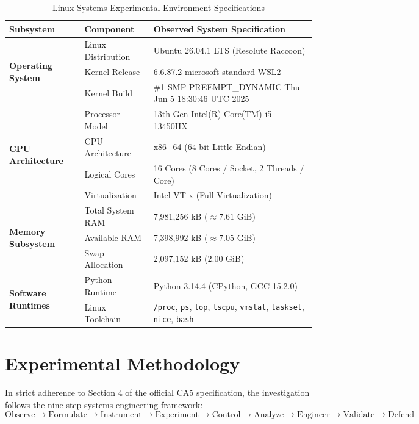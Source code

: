 \documentclass[11pt,a4paper]{article}
\begin{document}
\begin{table}[H]
\centering
\caption{Linux Systems Experimental Environment Specifications}
\label{tab:environment}
\begin{tabularx}{\textwidth}{llX}
\toprule
\textbf{Subsystem} & \textbf{Component} & \textbf{Observed System Specification} \\
\midrule
\multirow{3}{*}{\textbf{Operating System}} & Linux Distribution & Ubuntu 26.04.1 LTS (Resolute Raccoon) \\
 & Kernel Release & 6.6.87.2-microsoft-standard-WSL2 \\
 & Kernel Build & \#1 SMP PREEMPT\_DYNAMIC Thu Jun 5 18:30:46 UTC 2025 \\
\midrule
\multirow{4}{*}{\textbf{CPU Architecture}} & Processor Model & 13th Gen Intel(R) Core(TM) i5-13450HX \\
 & CPU Architecture & x86\_64 (64-bit Little Endian) \\
 & Logical Cores & 16 Cores (8 Cores / Socket, 2 Threads / Core) \\
 & Virtualization & Intel VT-x (Full Virtualization) \\
\midrule
\multirow{3}{*}{\textbf{Memory Subsystem}} & Total System RAM & 7,981,256 kB ($\approx 7.61$ GiB) \\
 & Available RAM & 7,398,992 kB ($\approx 7.05$ GiB) \\
 & Swap Allocation & 2,097,152 kB ($2.00$ GiB) \\
\midrule
\multirow{2}{*}{\textbf{Software Runtimes}} & Python Runtime & Python 3.14.4 (CPython, GCC 15.2.0) \\
 & Linux Toolchain & \texttt{/proc}, \texttt{ps}, \texttt{top}, \texttt{lscpu}, \texttt{vmstat}, \texttt{taskset}, \texttt{nice}, \texttt{bash} \\
\bottomrule
\end{tabularx}
\end{table}

\section{Experimental Methodology}

In strict adherence to Section 4 of the official CA5 specification, the investigation follows the nine-step systems engineering framework:
\begin{equation}
\text{Observe} \rightarrow \text{Formulate} \rightarrow \text{Instrument} \rightarrow \text{Experiment} \rightarrow \text{Control} \rightarrow \text{Analyze} \rightarrow \text{Engineer} \rightarrow \text{Validate} \rightarrow \text{Defend}
\end{equation}
\end{document}
